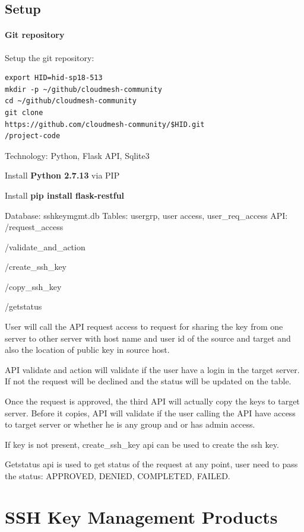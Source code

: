 \subsection{Setup}
\paragraph{Git repository}
Setup the git repository:
\begin{verbatim}
export HID=hid-sp18-513 
mkdir -p ~/github/cloudmesh-community
cd ~/github/cloudmesh-community 
git clone
https://github.com/cloudmesh-community/$HID.git
/project-code
\end{verbatim}

Technology: Python, Flask API, Sqlite3

Install \textbf{Python 2.7.13} via PIP

Install \textbf{pip install flask-restful} 

Database: sshkeymgmt.db 
Tables: usergrp, user access, user\_req\_access 
API: 
    /request\_access

    /validate\_and\_action

    /create\_ssh\_key

    /copy\_ssh\_key

    /getstatus

User will call the API request access to request for sharing 
the key from one server to other server with host name and 
user id of the source and target and also the location of 
public key in source host.

API validate and action will validate if the user have a 
login in the target server. If not the request will be declined
and the status will be updated on the table.

Once the request is approved, the third API will actually copy
the keys to target server. Before it copies, API will validate
if the user calling the API have access to target server or
whether he is any group and or has admin access. 

If key is not present, create\_ssh\_key api can be used to
create the ssh key.

Getstatus api is used to get status of the request at any point,
user need to pass the status: APPROVED, DENIED, COMPLETED, FAILED.

\section{SSH Key Management Products}

